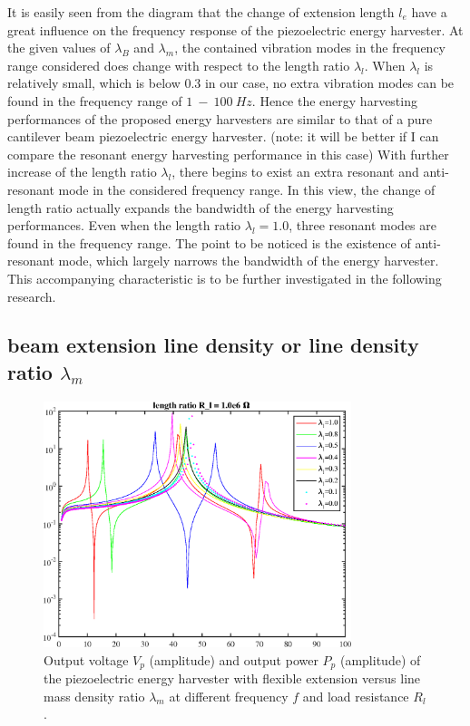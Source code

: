 \documentclass{elsarticle}
\begin{document}
It is easily seen from the diagram that the change of extension length $l_e$ have a great influence on the frequency response of the piezoelectric energy harvester. At the given values of $\lambda_B$ and $\lambda_m$, the contained vibration modes in the frequency range considered does change with respect to
the length ratio $\lambda_l$. When $\lambda_l$ is relatively small, which is below $0.3$ in our case, no extra vibration modes can be found in the frequency range of $1\ - \ 100\ Hz$. Hence the energy harvesting performances of the proposed energy harvesters are similar to that of a pure cantilever beam piezoelectric energy harvester. (note: it will be better if I can compare the resonant energy harvesting performance in this case) With further increase of the length ratio $\lambda_l$, there begins to exist an extra resonant and anti-resonant mode in the considered frequency range. In this view, the change of length ratio actually expands the bandwidth of the energy harvesting performances. Even when the length ratio $\lambda_l = 1.0$, three resonant modes are found in the frequency range. The point to be noticed is the existence of anti-resonant mode, which largely narrows the bandwidth of the energy harvester. This accompanying characteristic is to be further investigated in the following research. 

\subsection{beam extension line density or line density ratio $\lambda_m$}


\begin{figure}[!htbp]
    \centering
    \includegraphics[width=0.8\textwidth]{./fig_laml_vol_versus_fr_Rl.eps}
    \caption{Output voltage $V_p$ (amplitude) and output power $P_p$ (amplitude) of the piezoelectric energy harvester with flexible extension versus line mass density ratio $\lambda_m$ at different frequency $f$ and load resistance $R_l$. }
    \label{fig:fig_lamm_vol_versus_fr_Rl}
\end{figure}
\end{document}
